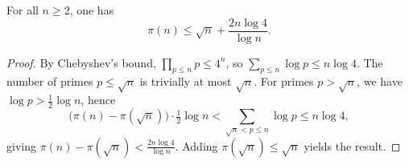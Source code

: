 \begin{sublemma}
\label{primeCounting-le-bound}
\leanok
For all $n \geq 2$, one has
  $$\pi(n) \leq \sqrt{n} + \frac{2n \log 4}{\log n}.$$
\end{sublemma}
\begin{proof}
\leanok
By Chebyshev's bound, $\prod_{p \leq n} p \leq 4^n$, so
$\sum_{p \leq n} \log p \leq n \log 4$. The number of primes $p \leq \sqrt{n}$ is trivially
at most $\sqrt{n}$. For primes $p > \sqrt{n}$, we have $\log p > \frac{1}{2} \log n$, hence
$$\bigl(\pi(n) - \pi(\sqrt{n})\bigr) \cdot \tfrac{1}{2} \log n
  < \sum_{\sqrt{n} < p \leq n} \log p \leq n \log 4,$$
giving $\pi(n) - \pi(\sqrt{n}) < \frac{2n \log 4}{\log n}$. Adding $\pi(\sqrt{n}) \leq \sqrt{n}$
yields the result.
\end{proof}

